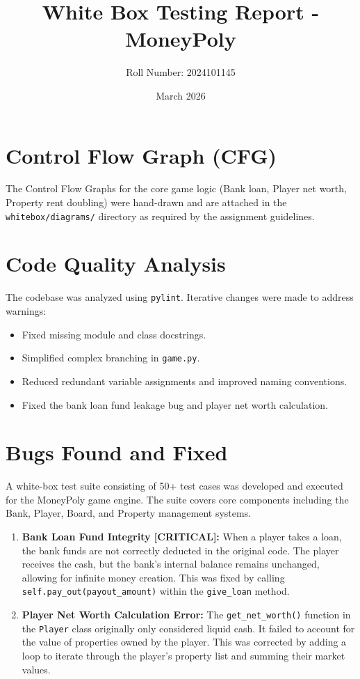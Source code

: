 \documentclass{article}
\title{White Box Testing Report - MoneyPoly}
\author{Roll Number: 2024101145}
\date{March 2026}
\begin{document}
\maketitle

\section{Control Flow Graph (CFG)}
The Control Flow Graphs for the core game logic (Bank loan, Player net worth, Property rent doubling) were hand-drawn and are attached in the \texttt{whitebox/diagrams/} directory as required by the assignment guidelines.

\section{Code Quality Analysis}
The codebase was analyzed using \texttt{pylint}. Iterative changes were made to address warnings:
\begin{itemize}
    \item Fixed missing module and class docstrings.
    \item Simplified complex branching in \texttt{game.py}.
    \item Reduced redundant variable assignments and improved naming conventions.
    \item Fixed the bank loan fund leakage bug and player net worth calculation.
\end{itemize}

\section{Bugs Found and Fixed}
A white-box test suite consisting of 50+ test cases was developed and executed for the MoneyPoly game engine. The suite covers core components including the Bank, Player, Board, and Property management systems.

\begin{enumerate}
    \item \textbf{Bank Loan Fund Integrity [CRITICAL]:} 
    When a player takes a loan, the bank funds are not correctly deducted in the original code. The player receives the cash, but the bank's internal balance remains unchanged, allowing for infinite money creation. This was fixed by calling \texttt{self.pay_out(payout_amount)} within the \texttt{give_loan} method.
    \item \textbf{Player Net Worth Calculation Error:} 
    The \texttt{get_net_worth()} function in the \texttt{Player} class originally only considered liquid cash. It failed to account for the value of properties owned by the player. This was corrected by adding a loop to iterate through the player's property list and summing their market values.
\end{enumerate}
\end{document}

